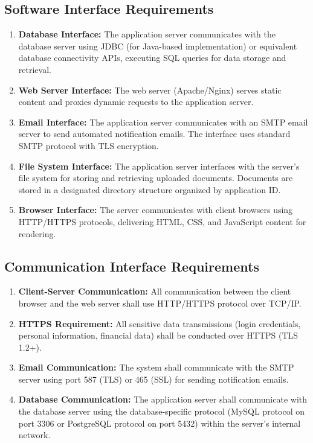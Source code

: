 \subsection{Software Interface Requirements}

\begin{enumerate}
  \item \textbf{Database Interface:} The application server communicates with the database server using JDBC (for Java-based implementation) or equivalent database connectivity APIs, executing SQL queries for data storage and retrieval.
  \item \textbf{Web Server Interface:} The web server (Apache/Nginx) serves static content and proxies dynamic requests to the application server.
  \item \textbf{Email Interface:} The application server communicates with an SMTP email server to send automated notification emails. The interface uses standard SMTP protocol with TLS encryption.
  \item \textbf{File System Interface:} The application server interfaces with the server's file system for storing and retrieving uploaded documents. Documents are stored in a designated directory structure organized by application ID.
  \item \textbf{Browser Interface:} The server communicates with client browsers using HTTP/HTTPS protocols, delivering HTML, CSS, and JavaScript content for rendering.
\end{enumerate}

\subsection{Communication Interface Requirements}

\begin{enumerate}
  \item \textbf{Client-Server Communication:} All communication between the client browser and the web server shall use HTTP/HTTPS protocol over TCP/IP.
  \item \textbf{HTTPS Requirement:} All sensitive data transmissions (login credentials, personal information, financial data) shall be conducted over HTTPS (TLS 1.2+).
  \item \textbf{Email Communication:} The system shall communicate with the SMTP server using port 587 (TLS) or 465 (SSL) for sending notification emails.
  \item \textbf{Database Communication:} The application server shall communicate with the database server using the database-specific protocol (MySQL protocol on port 3306 or PostgreSQL protocol on port 5432) within the server's internal network.
\end{enumerate}

